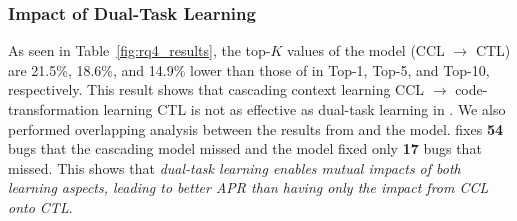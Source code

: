 



\subsubsection{\bf Impact of Dual-Task Learning}
\label{ccl:sec}

As seen in Table~\ref{fig:rq4_results}, the top-$K$ values of the
 model (CCL $\rightarrow$ CTL) are 21.5\%, 18.6\%, and
14.9\% lower than those of {\tool} in Top-1, Top-5, and Top-10,
respectively. This result shows that cascading context learning CCL
$\rightarrow$ code-transformation learning CTL is not as effective as
dual-task learning in {\tool}. We also performed overlapping analysis
between the results from {\tool} and the 
model. {\tool} fixes {\bf 54} bugs that the cascading model missed and
the  model fixed only {\bf 17} bugs that {\tool}
missed. This shows that {\em dual-task learning enables mutual impacts
  of both learning aspects, leading to better APR than having only the
  impact from CCL onto CTL}.



